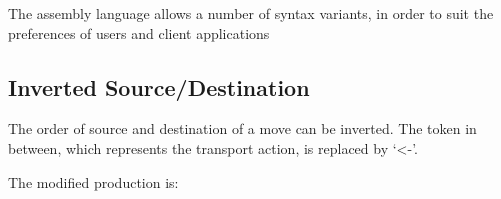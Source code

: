 \documentclass[twoside]{tce}
\begin{document}
The assembly language allows a number of syntax variants, in order to suit
the preferences of users and client applications

\subsection{Inverted Source/Destination}

The order of source and destination of a move can be inverted.  The token in
between, which represents the transport action, is replaced by `<-'.

The modified production is:
\begin{grammar}
      \grlit{<-} 
\end{grammar}




\cleardoublepage

\end{document}
